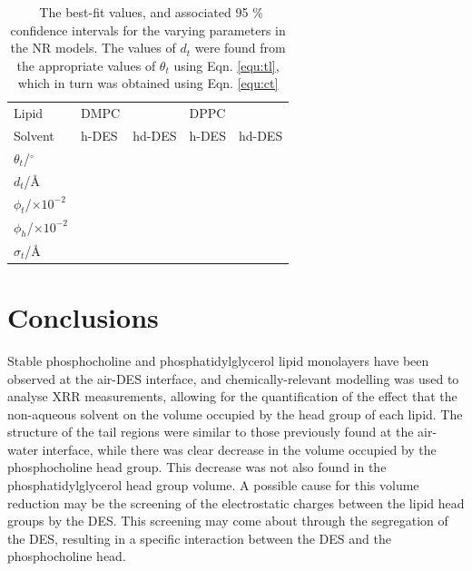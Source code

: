 \documentclass[twoside,twocolumn,9pt]{article}
\begin{document}
\begin{table}
	\small
	\caption{\ The best-fit values, and associated 95 \% confidence intervals for the varying parameters in the NR models. The values of $d_t$ were found from the appropriate values of $\theta_t$ using Eqn. \ref{equ:tl}, which in turn was obtained using Eqn. \ref{equ:ct}}
	\label{tab:neutron}
	\begin{tabular*}{0.48\textwidth}{@{\extracolsep{\fill}}lllll}
		\hline
		Lipid & DMPC & & DPPC & \\
		Solvent & h-DES & hd-DES & h-DES & hd-DES \\
		\hline
		$\theta_t$/$^\circ$ &  &  &  &  \\
		$d_t$/\AA &  &  &  &  \\ 
		$\phi_t$/$\times10^{-2}$ &  &  &  &  \\
		$\phi_h$/$\times10^{-2}$ &  &  &  &  \\
		$\sigma_t$/\AA &  &  &  &  \\
		\hline
	\end{tabular*}
\end{table}

\section{Conclusions}
Stable phosphocholine and phosphatidylglycerol lipid monolayers have been observed at the air-DES interface, and chemically-relevant modelling was used to analyse XRR measurements, allowing for the quantification of the effect that the non-aqueous solvent on the volume occupied by the head group of each lipid. The structure of the tail regions were similar to those previously found at the air-water interface, while there was clear decrease in the volume occupied by the phosphocholine head group. This decrease was not also found in the phosphatidylglycerol head group volume. A possible cause for this volume reduction may be the screening of the electrostatic charges between the lipid head groups by the DES. This screening may come about through the segregation of the DES, resulting in a specific interaction between the DES and the phosphocholine head. 
\end{document}
